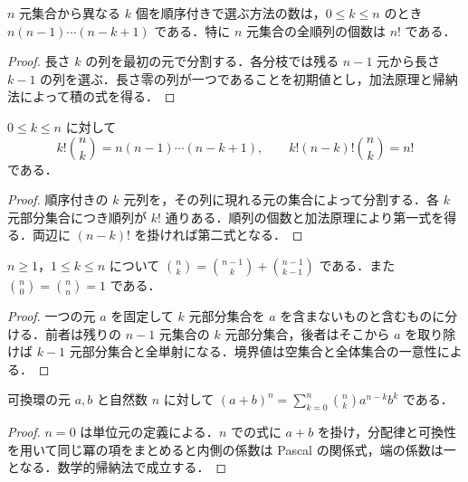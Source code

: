 \begin{prop}[順列の個数]
$n$ 元集合から異なる $k$ 個を順序付きで選ぶ方法の数は，$0\leq k\leq n$ のとき $n(n-1)\cdots(n-k+1)$ である．特に $n$ 元集合の全順列の個数は $n!$ である．
\end{prop}
\begin{proof}
長さ $k$ の列を最初の元で分割する．各分枝では残る $n-1$ 元から長さ $k-1$ の列を選ぶ．長さ零の列が一つであることを初期値とし，加法原理と帰納法によって積の式を得る．
\end{proof}
\begin{prop}[二項係数の積表示]
$0\leq k\leq n$ に対して
\[
k!\binom nk=n(n-1)\cdots(n-k+1),\qquad
k!(n-k)!\binom nk=n!
\]
である．
\end{prop}
\begin{proof}
順序付きの $k$ 元列を，その列に現れる元の集合によって分割する．各 $k$ 元部分集合につき順列が $k!$ 通りある．順列の個数と加法原理により第一式を得る．両辺に $(n-k)!$ を掛ければ第二式となる．
\end{proof}
\begin{prop}[Pascalの関係式]
$n\geq1$，$1\leq k\leq n$ について $\binom nk=\binom{n-1}{k}+\binom{n-1}{k-1}$ である．また $\binom n0=\binom nn=1$ である．
\end{prop}
\begin{proof}
一つの元 $a$ を固定して $k$ 元部分集合を $a$ を含まないものと含むものに分ける．前者は残りの $n-1$ 元集合の $k$ 元部分集合，後者はそこから $a$ を取り除けば $k-1$ 元部分集合と全単射になる．境界値は空集合と全体集合の一意性による．
\end{proof}
\begin{prop}[二項定理]
可換環の元 $a,b$ と自然数 $n$ に対して $(a+b)^n=\sum_{k=0}^n\binom nk a^{n-k}b^k$ である．
\end{prop}
\begin{proof}
$n=0$ は単位元の定義による．$n$ での式に $a+b$ を掛け，分配律と可換性を用いて同じ冪の項をまとめると内側の係数は Pascal の関係式，端の係数は一となる．数学的帰納法で成立する．
\end{proof}
